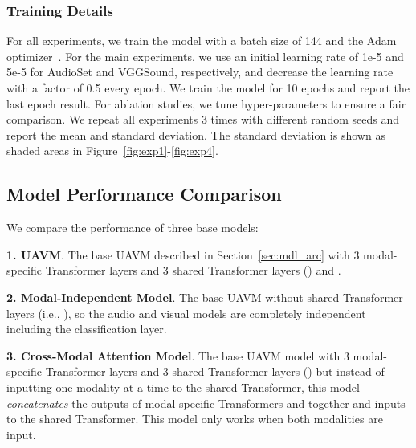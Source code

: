 \documentclass[journal]{IEEEtran}
\newcommand{\squeezeup}{\vspace{-1.6mm}}
\begin{document}
\subsubsection{Training Details}

For all experiments, we train the model with a batch size of 144 and the Adam optimizer~\cite{kingma2015adam}. For the main experiments, we use an initial learning rate of 1e-5 and 5e-5 for AudioSet and VGGSound, respectively, and decrease the learning rate with a factor of 0.5 every epoch. We train the model for 10 epochs and report the last epoch result. For ablation studies, we tune hyper-parameters to ensure a fair comparison. We repeat all experiments 3 times with different random seeds and report the mean and standard deviation. The standard deviation is shown as shaded areas in Figure~\ref{fig:exp1}-\ref{fig:exp4}.


\squeezeup\squeezeup
\subsection{Model Performance Comparison}

We compare the performance of three base models:

\textbf{1. UAVM}. The base UAVM described in Section~\ref{sec:mdl_arc} with 3 modal-specific Transformer layers and 3 shared Transformer layers () and .

\textbf{2. Modal-Independent Model}. The base UAVM without shared Transformer layers (i.e., ), so the audio and visual models are completely independent including the classification layer. 

\textbf{3. Cross-Modal Attention Model}. The base UAVM model with 3 modal-specific Transformer layers and 3 shared Transformer layers () but instead of inputting one modality at a time to the shared Transformer, this model \emph{concatenates} the outputs of modal-specific Transformers  and  together and inputs  to the shared Transformer. This model only works when both modalities are input.
\end{document}
